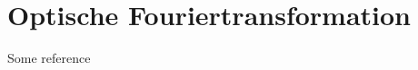 %
%
%
%
\chapter{Optische Fouriertransformation\label{chapter:opt}}
\begin{refsection}

Some reference \cite{opt:HSR:Physik2}

\printbibliography[heading=subbibliography]
\end{refsection}
